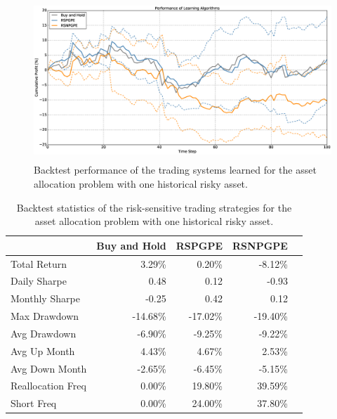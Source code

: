 \begin{figure}[t!]
	\centering
	\includegraphics[height=6cm,width=1.0\textwidth]{Images/8_11_single_hist_sensitive_performance}
	\caption[Backtest performance with one historical risky asset]{Backtest performance of the trading systems learned for the asset allocation problem with one historical risky asset.}
	\label{fig:8_11_single_hist_sensitive_performance}
\end{figure}

\begin{table}[t!]
\centering
\begin{tabular}{@{}lrrrr@{}}
\toprule
                  & Buy and Hold & RSPGPE   & RSNPGPE  \\ \midrule
Total Return      & 3.29\%       & 0.20\%   & -8.12\%  \\
Daily Sharpe      & 0.48         & 0.12     & -0.93    \\
Monthly Sharpe    & -0.25        & 0.42     & 0.12     \\
Max Drawdown      & -14.68\%     & -17.02\% & -19.40\% \\
Avg Drawdown      & -6.90\%      & -9.25\%  & -9.22\%  \\
Avg Up Month      & 4.43\%       & 4.67\%   & 2.53\%   \\
Avg Down Month    & -2.65\%      & -6.45\%  & -5.15\%  \\
Reallocation Freq & 0.00\%       & 19.80\%  & 39.59\%  \\
Short Freq        & 0.00\%       & 24.00\%  & 37.80\%  \\ \bottomrule
\end{tabular}
\caption[Backtest statistics for risk-sensitive learning with one historical risky asset]{Backtest statistics of the risk-sensitive trading strategies for the asset allocation problem with one historical risky asset.}
\label{tab:single_historical_sensitive_performance}
\end{table}
\clearpage




